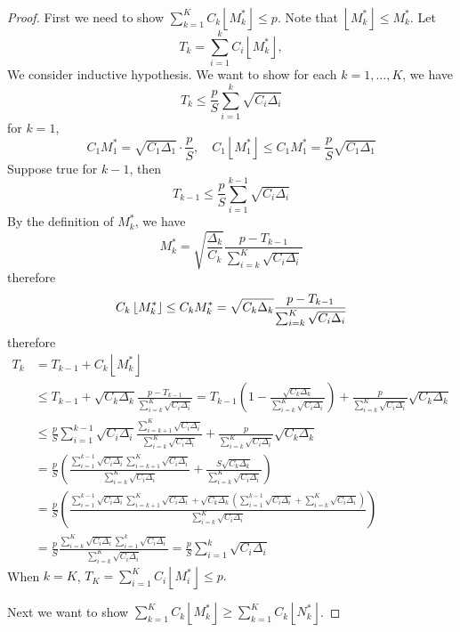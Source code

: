 \begin{proof}

First we need to show $\sum_{k=1}^K C_k\left\lfloor M_k^* \right\rfloor\le p$. Note that $\left\lfloor M_k^* \right\rfloor\le M_k^* $. Let 
\[
T_k = \sum_{i=1}^k C_i\left\lfloor M_k^* \right\rfloor, 
\]
We consider inductive hypothesis. We want to show for each $k=1,\ldots, K$, we have 
\[
T_k\le \frac{p}{S}\sum_{i=1}^k \sqrt{C_i\Delta_i}
\]
for $k=1$, 
\[
C_1M_1^*=\sqrt{C_1\Delta_1}\cdot \frac{p}{S}, \quad C_1 \left\lfloor M_1^* \right\rfloor \le C_1M_1^* = \frac{p}{S}\sqrt{C_1\Delta_1}
\]
Suppose true for $k-1$, then 
\[
T_{k-1}\le \frac{p}{S}\sum_{i=1}^{k-1} \sqrt{C_i\Delta_i}
\]
By the definition of $M_k^*$, we have
\[
M_k^* = \sqrt{\frac{\Delta_k}{C_k}}\frac{p-T_{k-1}}{\sum_{i=k}^K\sqrt{C_i\Delta_i}}
\]
therefore
\[
C_k \left\lfloor M_k^* \right\rfloor \le C_k M_k^*  = \sqrt{C_k\Delta_k}\frac{p-T_{k-1}}{\sum_{i=k}^K\sqrt{C_i\Delta_i}}\\
\]
therefore
\begin{align*}
    T_k &= T_{k-1}+C_k\left\lfloor M_k^* \right\rfloor \\
    &\le T_{k-1} + \sqrt{C_k\Delta_k}\frac{p-T_{k-1}}{\sum_{i=k}^K\sqrt{C_i\Delta_i}}
    =T_{k-1}\left(1-\frac{\sqrt{C_k\Delta_k}}{\sum_{i=k}^K\sqrt{C_i\Delta_i}}\right) + \frac{p}{\sum_{i=k}^K\sqrt{C_i\Delta_i}}\sqrt{C_k\Delta_k}\\
    &\le \frac{p}{S}\sum_{i=1}^{k-1} \sqrt{C_i\Delta_i}\frac{\sum_{i=k+1}^K\sqrt{C_i\Delta_i}}{\sum_{i=k}^K\sqrt{C_i\Delta_i}}+\frac{p}{\sum_{i=k}^K\sqrt{C_i\Delta_i}}\sqrt{C_k\Delta_k}\\
    &=\frac{p}{S}\left(\frac{\sum_{i=1}^{k-1} \sqrt{C_i\Delta_i}\sum_{i=k+1}^K\sqrt{C_i\Delta_i}}{\sum_{i=k}^K\sqrt{C_i\Delta_i}}+\frac{S\sqrt{C_k\Delta_k}}{\sum_{i=k}^K\sqrt{C_i\Delta_i}}\right)\\
    &=\frac{p}{S}\left(\frac{\sum_{i=1}^{k-1} \sqrt{C_i\Delta_i}\sum_{i=k+1}^K\sqrt{C_i\Delta_i}+\sqrt{C_k\Delta_k}\left(\sum_{i=1}^{k-1}\sqrt{C_i\Delta_i}+\sum_{i=k}^K\sqrt{C_i\Delta_i}\right)}{\sum_{i=k}^K\sqrt{C_i\Delta_i}}\right)\\
    &=\frac{p}{S}\frac{\sum_{i=k}^K\sqrt{C_i\Delta_i}\sum_{i=1}^k\sqrt{C_i\Delta_i}}{\sum_{i=k}^K\sqrt{C_i\Delta_i}}=\frac{p}{S}\sum_{i=1}^k\sqrt{C_i\Delta_i}
\end{align*}
When $k=K$, $T_K = \sum_{i=1}^K C_i\left\lfloor M_i^* \right\rfloor\le p.$

Next we want to show $\sum_{k=1}^K C_k\left\lfloor M_k^* \right\rfloor\ge \sum_{k=1}^K C_k\left\lfloor N_k^* \right\rfloor$.


\end{proof}
